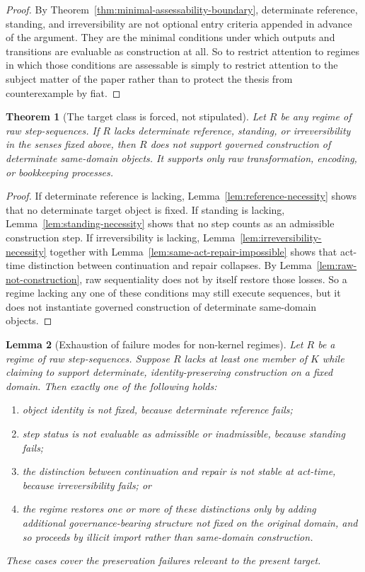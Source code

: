 \documentclass[11pt]{article}
\newtheorem{theorem}{Theorem}[section]
\newtheorem{lemma}[theorem]{Lemma}
\theoremstyle{definition}
\theoremstyle{remark}
\begin{document}
\begin{proof}
By Theorem~\ref{thm:minimal-assessability-boundary}, determinate reference, standing, and irreversibility are not optional entry criteria appended in advance of the argument. They are the minimal conditions under which outputs and transitions are evaluable as construction at all. So to restrict attention to regimes in which those conditions are assessable is simply to restrict attention to the subject matter of the paper rather than to protect the thesis from counterexample by fiat.
\end{proof}

\begin{theorem}[The target class is forced, not stipulated]\label{thm:forced-target-class}
Let $R$ be any regime of raw step-sequences. If $R$ lacks determinate reference, standing, or irreversibility in the senses fixed above, then $R$ does not support governed construction of determinate same-domain objects. It supports only raw transformation, encoding, or bookkeeping processes.
\end{theorem}

\begin{proof}
If determinate reference is lacking, Lemma~\ref{lem:reference-necessity} shows that no determinate target object is fixed. If standing is lacking, Lemma~\ref{lem:standing-necessity} shows that no step counts as an admissible construction step. If irreversibility is lacking, Lemma~\ref{lem:irreversibility-necessity} together with Lemma~\ref{lem:same-act-repair-impossible} shows that act-time distinction between continuation and repair collapses. By Lemma~\ref{lem:raw-not-construction}, raw sequentiality does not by itself restore those losses. So a regime lacking any one of these conditions may still execute sequences, but it does not instantiate governed construction of determinate same-domain objects.
\end{proof}

\begin{lemma}[Exhaustion of failure modes for non-kernel regimes]\label{lem:failure-mode-exhaustion}
Let $R$ be a regime of raw step-sequences. Suppose $R$ lacks at least one member of $K$ while claiming to support determinate, identity-preserving construction on a fixed domain. Then exactly one of the following holds:
\begin{enumerate}[label=(\roman*)]
\item object identity is not fixed, because determinate reference fails;
\item step status is not evaluable as admissible or inadmissible, because standing fails;
\item the distinction between continuation and repair is not stable at act-time, because irreversibility fails; or
\item the regime restores one or more of these distinctions only by adding additional governance-bearing structure not fixed on the original domain, and so proceeds by illicit import rather than same-domain construction.
\end{enumerate}
These cases cover the preservation failures relevant to the present target.
\end{lemma}
\end{document}
